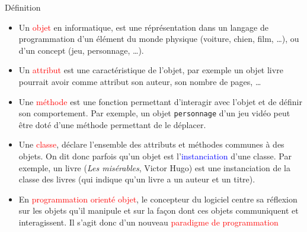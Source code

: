 \documentclass[10pt]{beamer}
\begin{document}
\begin{frame}
	\mframe{\POO}
	\begin{alertblock}{Définition}
		\begin{itemize}[label=\textbullet]
			\item<1-> Un \textcolor{red}{objet} en informatique, est une réprésentation dans un langage de programmation d'un élément du monde  physique (voiture, chien, film, \dots),  ou d'un concept (jeu, personnage, \dots).
			\item<2-> Un \textcolor{red}{attribut} est une caractéristique de l'objet, par exemple un objet livre pourrait avoir comme attribut son auteur, son nombre de pages, \dots
			\item<3-> Une \textcolor{red}{méthode} est une fonction permettant d'interagir avec l'objet et de définir son comportement. Par exemple, un objet {\tt personnage} d'un jeu vidéo peut être doté d'une méthode permettant de le déplacer.
			\item<4-> Une \textcolor{red}{classe}, déclare l'ensemble des attributs et méthodes communes à des objets. On dit donc parfois qu'un objet est l'\textcolor{blue}{instanciation} d'une classe. Par exemple, un livre (\textit{Les misérables}, Victor Hugo) est une instanciation de la classe des livres (qui indique qu'un livre a un auteur et un titre).
			\item<5-> En \textcolor{red}{programmation orienté objet}, le concepteur du logiciel centre sa réflexion sur les objets qu'il manipule et sur la façon dont ces objets communiquent et interagissent. Il s'agit donc d'un nouveau \textcolor{red}{paradigme de programmation}
		\end{itemize}
	\end{alertblock}
\end{frame}
\end{document}
